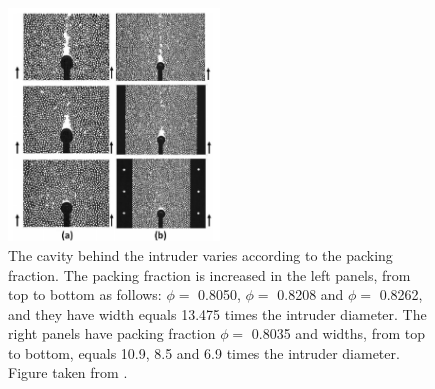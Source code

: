 \begin{figure}
    \centering
    \includegraphics[width=0.5\textwidth]{04-figuras/box_Kolb.png}
    \caption[Cavity formed by a fixed intruder in a dense granular packing.]{The cavity behind the intruder varies according to the packing fraction. The packing fraction is increased in the left panels, from top to bottom as follows: $\phi=$ 0.8050, $\phi=$ 0.8208 and $\phi=$ 0.8262, and they have width equals 13.475 times the intruder diameter. The right panels have packing fraction $\phi=$ 0.8035 and widths, from top to bottom, equals 10.9, 8.5 and 6.9 times the intruder diameter. Figure taken from \cite{Jamming_and_unjamming_by_penetration_of_a_cylindrical_intruder}.}
    \label{fig:box_Kolb}
\end{figure}



